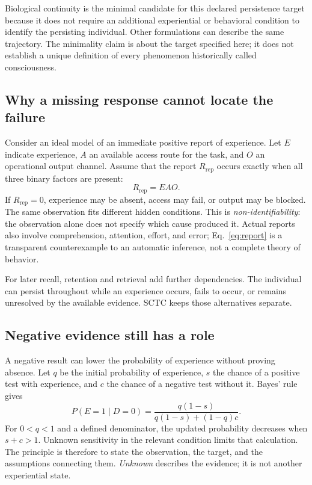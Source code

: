 \documentclass[11pt,letterpaper]{article}
\begin{document}
Biological continuity is the minimal candidate for this declared persistence target because it does not require an additional experiential or behavioral condition to identify the persisting individual. Other formulations can describe the same trajectory. The minimality claim is about the target specified here; it does not establish a unique definition of every phenomenon historically called consciousness.

\subsection*{Why a missing response cannot locate the failure}
Consider an ideal model of an immediate positive report of experience. Let $E$ indicate experience, $A$ an available access route for the task, and $O$ an operational output channel. Assume that the report $R_{\mathrm{rep}}$ occurs exactly when all three binary factors are present:
\begin{equation}
R_{\mathrm{rep}}=EAO.
\label{eq:report}
\end{equation}
If $R_{\mathrm{rep}}=0$, experience may be absent, access may fail, or output may be blocked. The same observation fits different hidden conditions. This is \emph{non-identifiability}: the observation alone does not specify which cause produced it. Actual reports also involve comprehension, attention, effort, and error; Eq.~\ref{eq:report} is a transparent counterexample to an automatic inference, not a complete theory of behavior.

For later recall, retention and retrieval add further dependencies. The individual can persist throughout while an experience occurs, fails to occur, or remains unresolved by the available evidence. SCTC keeps those alternatives separate.

\subsection*{Negative evidence still has a role}
A negative result can lower the probability of experience without proving absence. Let $q$ be the initial probability of experience, $s$ the chance of a positive test with experience, and $c$ the chance of a negative test without it. Bayes' rule gives
\begin{equation}
P(E=1\mid D=0)=\frac{q(1-s)}{q(1-s)+(1-q)c}.
\label{eq:bayes}
\end{equation}
For $0<q<1$ and a defined denominator, the updated probability decreases when $s+c>1$. Unknown sensitivity in the relevant condition limits that calculation. The principle is therefore to state the observation, the target, and the assumptions connecting them. \emph{Unknown} describes the evidence; it is not another experiential state.
\end{document}
